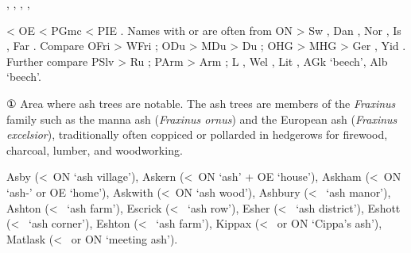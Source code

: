 \documentclass[12pt,letterpaper,oneside,article,draft]{memoir}
\begin{document}
\begin{Lemma}
\begin{Also}
	, , , , 
\end{Also}
\begin{Etymology}
	< OE  < PGmc  < PIE .
	Names with  or  are often from ON 
		> Sw , Dan , Nor , Is , Far .
	Compare
	OFri  > WFri ;
	ODu  > MDu  > Du ;
	OHG  > MHG  > Ger , Yid  .
	Further compare
	PSlv  > Ru  ;
	PArm  > Arm  ;
	L , Wel , Lit , AGk   ‘beech’, Alb  ‘beech’.
\end{Etymology}
\begin{Definitions}
	① Area where ash trees are notable. The ash trees are members of the \textit{Fraxinus} family such as the manna ash (\textit{Fraxinus ornus}) and the European ash (\textit{Fraxinus excelsior}), traditionally often coppiced or pollarded in hedgerows for firewood, charcoal, lumber, and woodworking.
\end{Definitions}
\begin{Examples}
	Asby (<~ON  ‘ash village’), Askern (<~ON  ‘ash’ + OE  ‘house’), Askham (<~ON  ‘ash-’ or OE  ‘home’), Askwith (<~ON  ‘ash wood’), Ashbury (<~ ‘ash manor’), Ashton (<~ ‘ash farm’), Escrick (<~ ‘ash row’), Esher (<~ ‘ash district’), Eshott (<~ ‘ash corner’), Eshton (<~ ‘ash farm’), Kippax (<~ or ON  ‘Cippa’s ash’), Matlask (<~ or ON  ‘meeting ash’).
\end{Examples}
\end{Lemma}
\end{document}
